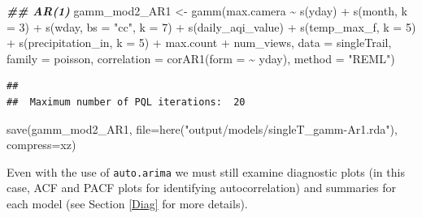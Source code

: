 \documentclass[
]{book}
\newenvironment{Shaded}{\begin{snugshade}}{\end{snugshade}}
\newcommand{\AttributeTok}[1]{\textcolor[rgb]{0.77,0.63,0.00}{#1}}
\newcommand{\DecValTok}[1]{\textcolor[rgb]{0.00,0.00,0.81}{#1}}
\newcommand{\DocumentationTok}[1]{\textcolor[rgb]{0.56,0.35,0.01}{\textbf{\textit{#1}}}}
\newcommand{\FunctionTok}[1]{\textcolor[rgb]{0.00,0.00,0.00}{#1}}
\newcommand{\NormalTok}[1]{#1}
\newcommand{\OtherTok}[1]{\textcolor[rgb]{0.56,0.35,0.01}{#1}}
\newcommand{\SpecialCharTok}[1]{\textcolor[rgb]{0.00,0.00,0.00}{#1}}
\newcommand{\StringTok}[1]{\textcolor[rgb]{0.31,0.60,0.02}{#1}}
\begin{document}
\begin{Shaded}
\begin{Highlighting}[]
 \DocumentationTok{\#\# AR(1)}
\NormalTok{gamm\_mod2\_AR1 }\OtherTok{\textless{}{-}} \FunctionTok{gamm}\NormalTok{(max.camera }\SpecialCharTok{\textasciitilde{}} 
                        \FunctionTok{s}\NormalTok{(yday) }\SpecialCharTok{+}
                        \FunctionTok{s}\NormalTok{(month, }\AttributeTok{k =} \DecValTok{3}\NormalTok{) }\SpecialCharTok{+}
                        \FunctionTok{s}\NormalTok{(wday, }
                          \AttributeTok{bs =} \StringTok{"cc"}\NormalTok{, }\AttributeTok{k =} \DecValTok{7}\NormalTok{) }\SpecialCharTok{+}
                        \FunctionTok{s}\NormalTok{(daily\_aqi\_value) }\SpecialCharTok{+}
                        \FunctionTok{s}\NormalTok{(temp\_max\_f, }\AttributeTok{k =} \DecValTok{5}\NormalTok{) }\SpecialCharTok{+}
                        \FunctionTok{s}\NormalTok{(precipitation\_in, }\AttributeTok{k =} \DecValTok{5}\NormalTok{) }\SpecialCharTok{+}
\NormalTok{                        max.count }\SpecialCharTok{+} 
\NormalTok{                        num\_views,}
              \AttributeTok{data =}\NormalTok{ singleTrail, }
              \AttributeTok{family =}\NormalTok{ poisson,}
              \AttributeTok{correlation =} \FunctionTok{corAR1}\NormalTok{(}\AttributeTok{form =} \SpecialCharTok{\textasciitilde{}}\NormalTok{ yday),}
              \AttributeTok{method =} \StringTok{"REML"}\NormalTok{)}
\end{Highlighting}
\end{Shaded}

\begin{verbatim}
## 
##  Maximum number of PQL iterations:  20
\end{verbatim}

\begin{Shaded}
\begin{Highlighting}[]
\FunctionTok{save}\NormalTok{(gamm\_mod2\_AR1, }
     \AttributeTok{file=}\FunctionTok{here}\NormalTok{(}\StringTok{"output/models/singleT\_gamm{-}Ar1.rda"}\NormalTok{), }
     \AttributeTok{compress=}\StringTok{\textquotesingle{}xz\textquotesingle{}}\NormalTok{)}
\end{Highlighting}
\end{Shaded}

Even with the use of \texttt{auto.arima} we must still examine diagnostic plots (in this case, ACF and PACF plots for identifying autocorrelation) and summaries for each model (see Section \ref{Diag} for more details).
\end{document}

